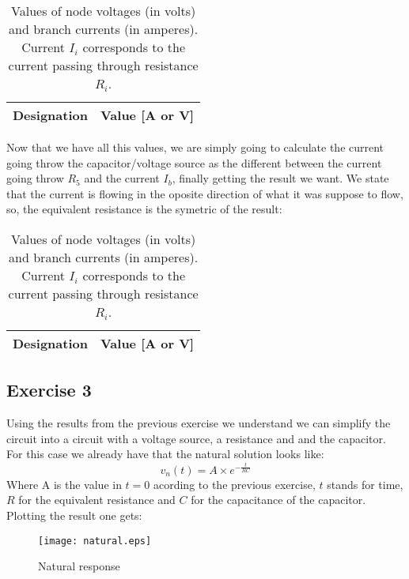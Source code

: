 \begin{table}[H]
  \centering
  \begin{tabular}{|c|c|}
    \hline
        {\bf Designation} & {\bf Value [A or V]} \\ \hline
        
  \end{tabular}
  \caption{Values of node voltages (in volts) and branch currents (in amperes). Current $I_i$ corresponds to the current passing through resistance $R_i$.}
  \label{tab:Exercise2Theoretical}
\end{table}
Now that we have all this values, we are simply going to calculate the current going throw the capacitor/voltage source as the different between the current going throw $R_5$ and the current $I_b$, finally getting the result we want. We state that the current is flowing in the oposite direction of what it was suppose to flow, so, the equivalent resistance is the symetric of the result:
\begin{table}[H]
  \centering
  \begin{tabular}{|c|c|}
    \hline
        {\bf Designation} & {\bf Value [A or V]} \\ \hline
        
  \end{tabular}
  \caption{Values of node voltages (in volts) and branch currents (in amperes). Current $I_i$ corresponds to the current passing through resistance $R_i$.}
  \label{tab:Exercise2.1Theoretical}
\end{table}

\subsection{Exercise 3}
Using the results from the previous exercise we understand we can simplify the circuit into a circuit with a voltage source, a resistance and and the capacitor. For this case we already have that the natural solution looks like:
\begin{equation}
  v_n(t)=A \times e^{-\frac{t}{RC}}
  \end{equation}
Where A is the value in $t=0$ acording to the previous exercise, $t$ stands for time, $R$ for the equivalent resistance and $C$ for the capacitance of the capacitor. Plotting the result one gets:
\begin{figure}[h] \centering
\texttt{[image: natural.eps]}
\caption{Natural response}
\label{fig:natural}
\end{figure}


